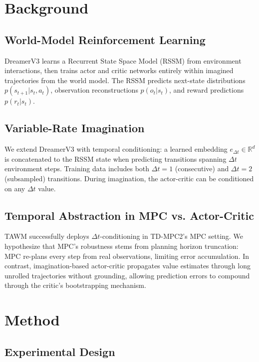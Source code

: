 \documentclass[letterpaper]{article}
\begin{document}
\section{Background}

\subsection{World-Model Reinforcement Learning}

DreamerV3 \citep{hafner2023dreamerv3} learns a Recurrent State Space Model (RSSM) from environment interactions, then trains actor and critic networks entirely within imagined trajectories from the world model. The RSSM predicts next-state distributions $p(s_{t+1} | s_t, a_t)$, observation reconstructions $p(o_t | s_t)$, and reward predictions $p(r_t | s_t)$.

\subsection{Variable-Rate Imagination}

We extend DreamerV3 with temporal conditioning: a learned embedding $e_{\Delta t} \in \mathbb{R}^d$ is concatenated to the RSSM state when predicting transitions spanning $\Delta t$ environment steps. Training data includes both $\Delta t=1$ (consecutive) and $\Delta t=2$ (subsampled) transitions. During imagination, the actor-critic can be conditioned on any $\Delta t$ value.

\subsection{Temporal Abstraction in MPC vs. Actor-Critic}

TAWM \citep{nhu2025tawm} successfully deploys $\Delta t$-conditioning in TD-MPC2's MPC setting. We hypothesize that MPC's robustness stems from planning horizon truncation: MPC re-plans every step from real observations, limiting error accumulation. In contrast, imagination-based actor-critic propagates value estimates through long unrolled trajectories without grounding, allowing prediction errors to compound through the critic's bootstrapping mechanism.

\section{Method}

\subsection{Experimental Design}
\end{document}
